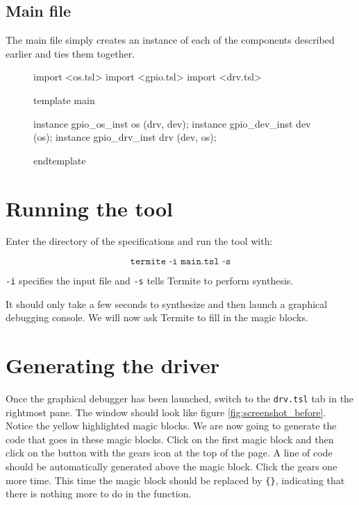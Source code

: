 \documentclass{article}
\newcommand{\code}[1]{\texttt{#1}}
\begin{document}
\subsection{Main file}

The main file simply creates an instance of each of the components described earlier and ties them together.

\begin{figure}[H]
\lstset{numbers=left}
\begin{tsllisting}
import <os.tsl>
import <gpio.tsl>
import <drv.tsl>

template main

instance gpio_os_inst  os  (drv, dev);
instance gpio_dev_inst dev (os);
instance gpio_drv_inst drv (dev, os);

endtemplate
\end{tsllisting}
\end{figure}

\section{Running the tool}
\label{sec:running}

Enter the directory of the specifications and run the tool with:

\[\code{termite -i main.tsl -s}\]

\code{-i} specifies the input file and \code{-s} tells Termite to perform synthesis.

It should only take a few seconds to synthesize and then launch a graphical debugging console. We will now ask Termite to fill in the magic blocks. 

\section{Generating the driver}

Once the graphical debugger has been launched, switch to the \code{drv.tsl} tab in the rightmost pane. The window should look like figure \ref{fig:screenshot_before}. Notice the yellow highlighted magic blocks. We are now going to generate the code that goes in these magic blocks. Click on the first magic block and then click on the button with the gears icon at the top of the page. A line of code should be automatically generated above the magic block. Click the gears one more time. This time the magic block should be replaced by \code{\{\}}, indicating that there is nothing more to do in the function. 
\end{document}
